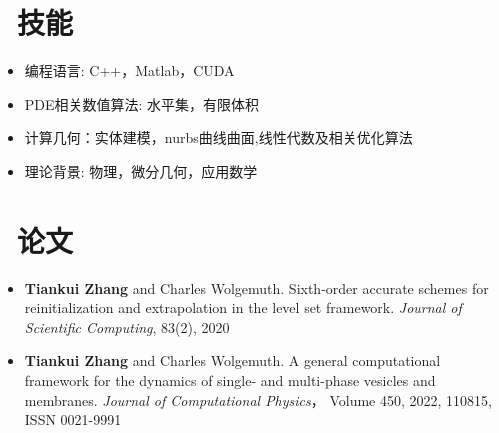 \documentclass{resume}
\begin{document}


\section{\faCogs\ 技能}
\begin{itemize}[parsep=0.5ex]
  \item 编程语言: C++，Matlab，CUDA
  \item PDE相关数值算法: 水平集，有限体积
  \item 计算几何：实体建模，nurbs曲线曲面,线性代数及相关优化算法
  \item 理论背景: 物理，微分几何，应用数学
\end{itemize}

\section{\faBook\ 论文}
\begin{itemize}[parsep=0.5ex]
  \item \textbf{Tiankui Zhang} and Charles Wolgemuth. Sixth-order accurate schemes for reinitialization and extrapolation in the level set framework. \textit{Journal of Scientific Computing}, 83(2), 2020
  \item \textbf{Tiankui Zhang} and Charles Wolgemuth. A general computational framework for the dynamics of single- and multi-phase vesicles and membranes. \textit{Journal of Computational Physics}， Volume 450, 2022, 110815, ISSN 0021-9991
\end{itemize}
\end{document}
